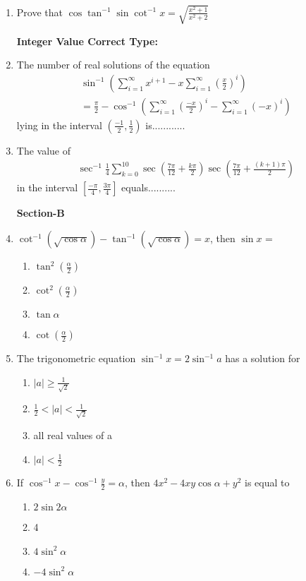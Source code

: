 \begin{enumerate}[label=\arabic*.,ref=\thesubsection.\theenumi]
\item Prove that $\cos \tan^{-1}\sin \cot^{-1}x = \sqrt{\frac{x^2 + 1}{x^2 + 2}}$

\textbf{Integer Value Correct Type:}

\item The number of real solutions of the equation
\begin{align*}
\sin^{-1} (\sum_{i = 1}^{\infty}x^{i + 1} - x\sum_{i = 1}^{\infty}(\frac{x}{2})^{i})\\
 = \frac{\pi}{2} - \cos^{-1}(\sum_{i = 1}^{\infty}(\frac{-x}{2})^{i} - \sum_{i = 1}^{\infty}(-x)^{i})
\end{align*}
lying in the interval $(\frac{-1}{2}, \frac{1}{2})$ is............

\item The value of 
\begin{align*}
\sec^{-1}\frac{1}{4}\sum_{k = 0}^{10}\sec(\frac{7\pi}{12} + \frac{k\pi}{2})\sec(\frac{7\pi}{12} + \frac{(k + 1)\pi}{2})
\end{align*}
in the interval $[\frac{-\pi}{4}, \frac{3\pi}{4}]$ equals..........

\textbf{Section-B}

\item $\cot^{-1}(\sqrt{\cos \alpha})-\tan^{-1}(\sqrt{\cos \alpha}) = x$, then $\sin x$ =
\begin{enumerate}
\item $\tan^{2}(\frac{\alpha}{2})$
\item $\cot^{2}(\frac{\alpha}{2})$
\item $\tan \alpha$
\item $\cot(\frac{\alpha}{2})$
\end{enumerate}

\item The trigonometric equation $\sin^{-1}x = 2\sin^{-1}a$ has a solution for
\begin{enumerate}
\item $|a| \geq \frac{1}{\sqrt{2}}$
\item $\frac{1}{2} < |a| < \frac{1}{\sqrt{2}}$
\item all real values of a
\item $|a| < \frac{1}{2}$
\end{enumerate}

\item If $\cos^{-1}x - \cos^{-1}\frac{y}{2} = \alpha$,  then $4x^2 - 4xy \cos \alpha + y^2$ is equal to
\begin{enumerate}
\item $2\sin 2\alpha$
\item 4
\item $4\sin^{2}\alpha$
\item $-4\sin^{2}\alpha$
\end{enumerate}


\end{enumerate}
